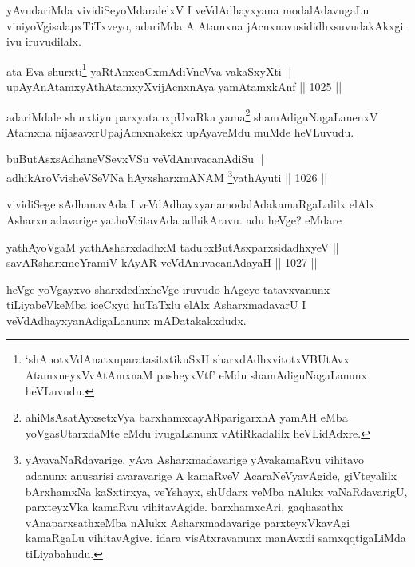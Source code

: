 \begin{artha}
yAvudariMda vividiSeyoMdaralelxV I veVdAdhayxyana modalAdavugaLu viniyoVgisalapxTiTxveyo, adariMda A Atamxna jAcnxnavusididhxsuvudakAkxgi ivu iruvudilalx.
\end{artha}


\begin{shl}
ata Eva shurxti\footnote{`shAnotxVdAnatxuparatasitxtikuSxH sharxdAdhxvitotxVBUtAvx AtamxneyxVvA\s \s tAmxnaM pasheyxVtf' eMdu shamAdiguNagaLanunx heVLuvudu.} yaRtAnxcaCxmAdiVneVva vakaSxyXti || \\
upAyAnAtamxyAthAtamxyXvijAcnxnAya yamAtamxkAnf \hfill || 1025 ||  
\end{shl}

\begin{artha}
adariMdale shurxtiyu parxyatanxpUvaRka yama\footnote{ahiMsAsatAyxsetxVya barxhamxcayAR\s parigarxhA yamAH eMba yoVgasUtarxdaMte eMdu ivugaLanunx vAtiRkadalilx heVLidAdxre.} shamAdiguNagaLanenxV Atamxna nijasavxrUpajAcnxnakekx upAyaveMdu muMde heVLuvudu.
\end{artha}


\begin{shl}
buButAsxsAdhaneVSevxVSu veVdAnuvacanAdiSu || \\
adhikAroV\s visheVSeVNa hAyxsharxmANAM \footnote{yAvavaNaRdavarige, yAva Asharxmadavarige yAvakamaRvu vihitavo adanunx anusarisi avaravarige A kamaRveV AcaraNeVyavAgide, giVteyalilx bArxhamxNa kaSxtirxya, veYshayx, shUdarx veMba nAlukx vaNaRdavarigU, parxteyxVka kamaRvu vihitavAgide. barxhamxcAri, gaqhasathx vAnaparxsathx\ndash eMba nAlukx Asharxmadavarige parxteyxVkavAgi kamaRgaLu vihitavAgive. idara visAtxravanunx manAvxdi samxqqtigaLiMda tiLiyabahudu.}yathAyuti \hfill || 1026 ||  
\end{shl}


\begin{artha}
vividiSege sAdhanavAda I veVdAdhayxyanamodalAdakamaRgaLalilx elAlx Asharxmadavarige yathoVcitavAda adhikAravu. adu heVge? eMdare
\end{artha}

\begin{shl}
yathAyoVgaM yathAsharxdadhxM tadubxButAsxparxsidadhxyeV || \\
savARsharxmeYramiV kAyAR veVdAnuvacanAdayaH \hfill || 1027 ||  
\end{shl}

\begin{artha}
heVge yoVgayxvo sharxdedhxheVge iruvudo hAgeye tatavxvanunx tiLiyabeVkeMba iceCxyu huTaTxlu elAlx AsharxmadavarU I veVdAdhayxyanAdigaLanunx mADatakakxdudx.
\end{artha}

